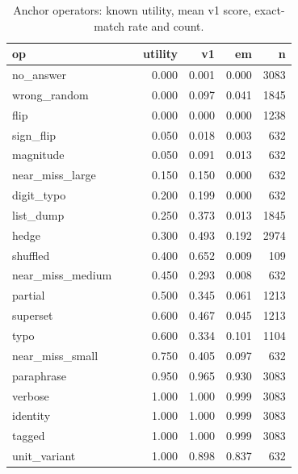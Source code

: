 \begin{table}[htbp]
\centering\scriptsize
\caption{Anchor operators: known utility, mean v1 score, exact-match rate and count.}
\label{tab:anchor_operators}
\setlength{\tabcolsep}{3pt}
\begin{tabular}{p{0.700\linewidth}rrrr}
\toprule
op & utility & v1 & em & n \\
\midrule
no\_\allowbreak{}answer & 0.000 & 0.001 & 0.000 & 3083 \\
wrong\_\allowbreak{}random & 0.000 & 0.097 & 0.041 & 1845 \\
flip & 0.000 & 0.000 & 0.000 & 1238 \\
sign\_\allowbreak{}flip & 0.050 & 0.018 & 0.003 & 632 \\
magnitude & 0.050 & 0.091 & 0.013 & 632 \\
near\_\allowbreak{}miss\_\allowbreak{}large & 0.150 & 0.150 & 0.000 & 632 \\
digit\_\allowbreak{}typo & 0.200 & 0.199 & 0.000 & 632 \\
list\_\allowbreak{}dump & 0.250 & 0.373 & 0.013 & 1845 \\
hedge & 0.300 & 0.493 & 0.192 & 2974 \\
shuffled & 0.400 & 0.652 & 0.009 & 109 \\
near\_\allowbreak{}miss\_\allowbreak{}medium & 0.450 & 0.293 & 0.008 & 632 \\
partial & 0.500 & 0.345 & 0.061 & 1213 \\
superset & 0.600 & 0.467 & 0.045 & 1213 \\
typo & 0.600 & 0.334 & 0.101 & 1104 \\
near\_\allowbreak{}miss\_\allowbreak{}small & 0.750 & 0.405 & 0.097 & 632 \\
paraphrase & 0.950 & 0.965 & 0.930 & 3083 \\
verbose & 1.000 & 1.000 & 0.999 & 3083 \\
identity & 1.000 & 1.000 & 0.999 & 3083 \\
tagged & 1.000 & 1.000 & 0.999 & 3083 \\
unit\_\allowbreak{}variant & 1.000 & 0.898 & 0.837 & 632 \\
\bottomrule
\end{tabular}
\end{table}

